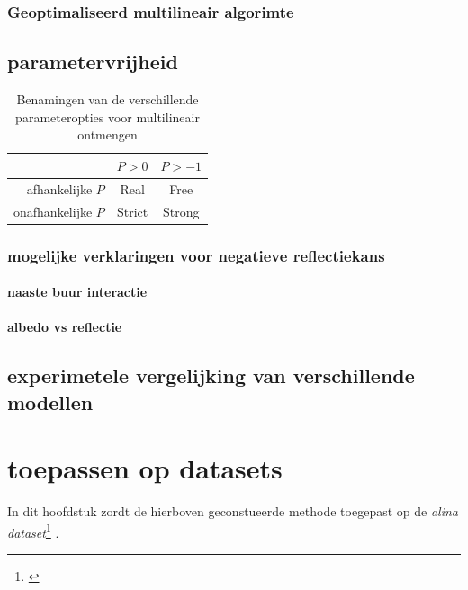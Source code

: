 \documentclass[12pt]{report}
\newcommand{\footcite}[1]{\cite{#1}\let\thefootnote\relax \footnote{\cite{#1} \bibentry{#1}} }
\begin{document}
\subsection{Geoptimaliseerd multilineair algorimte}


\section{parametervrijheid}

\begin{table}
\Large\center
\begin{tabular}{r|c c}
&$P>0$&$P>-1$ \\
\hline
afhankelijke $P$ & Real & Free \\
onafhankelijke $P$ & Strict & Strong
\end{tabular}
\caption{Benamingen van de verschillende parameteropties voor multilineair ontmengen}
\end{table}

\subsection{mogelijke verklaringen voor negatieve reflectiekans}

\subsubsection{naaste buur interactie}

\subsubsection{albedo vs reflectie}

\section{experimetele vergelijking van verschillende modellen}





\chapter{toepassen op datasets}

In dit hoofdstuk zordt de hierboven geconstueerde methode toegepast op de \textit{alina dataset}\footcite{alina}.
\end{document}
